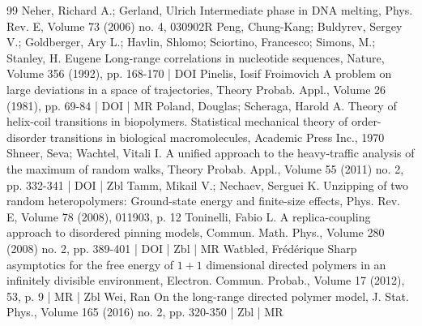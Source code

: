 \documentclass[10pt]{amsart}
\theoremstyle{definition}\newtheorem{defi}[theo]{Definition}\newtheorem{rema}[theo]{Remark}\newtheorem{exam}[theo]{Example}\newtheorem{exem}[theo]{Example}\newtheorem{nota}[theo]{Notation}
\begin{document}
\begin{thebibliography}{99}
Neher, Richard A.; Gerland, Ulrich Intermediate phase in DNA melting, Phys. Rev. E, Volume 73 (2006) no. 4, 030902R
Peng, Chung-Kang; Buldyrev, Sergey V.; Goldberger, Ary L.; Havlin, Shlomo; Sciortino, Francesco; Simons, M.; Stanley, H. Eugene Long-range correlations in nucleotide sequences, Nature, Volume 356 (1992), pp. 168-170 | DOI
Pinelis, Iosif Froimovich A problem on large deviations in a space of trajectories, Theory Probab. Appl., Volume 26 (1981), pp. 69-84 | DOI | MR
Poland, Douglas; Scheraga, Harold A. Theory of helix-coil transitions in biopolymers. Statistical mechanical theory of order-disorder transitions in biological macromolecules, Academic Press Inc., 1970
Shneer, Seva; Wachtel, Vitali I. A unified approach to the heavy-traffic analysis of the maximum of random walks, Theory Probab. Appl., Volume 55 (2011) no. 2, pp. 332-341 | DOI | Zbl
Tamm, Mikail V.; Nechaev, Serguei K. Unzipping of two random heteropolymers: Ground-state energy and finite-size effects, Phys. Rev. E, Volume 78 (2008), 011903, p. 12
Toninelli, Fabio L. A replica-coupling approach to disordered pinning models, Commun. Math. Phys., Volume 280 (2008) no. 2, pp. 389-401 | DOI | Zbl | MR
Watbled, Frédérique Sharp asymptotics for the free energy of $1+1$ dimensional directed polymers in an infinitely divisible environment, Electron. Commun. Probab., Volume 17 (2012), 53, p. 9 | MR | Zbl
Wei, Ran On the long-range directed polymer model, J. Stat. Phys., Volume 165 (2016) no. 2, pp. 320-350 | Zbl | MR
\end{thebibliography}
\end{document}
